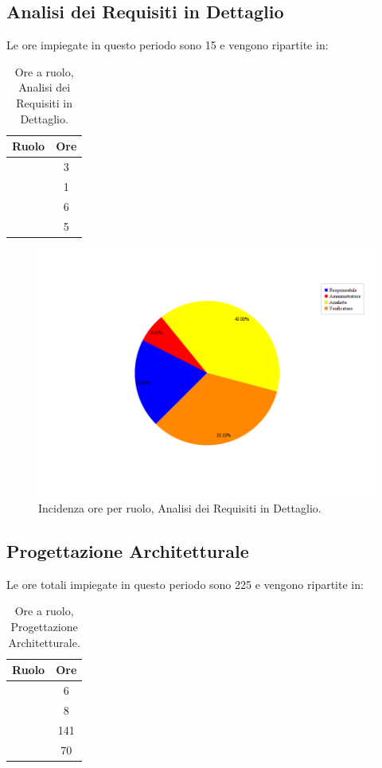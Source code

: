 \subsection{Analisi dei Requisiti in Dettaglio}
Le ore impiegate in questo periodo sono 15 e vengono ripartite in:

\begin{table}[H]
	\begin{center}
		\begin{tabular}{|c|c|}
			\hline
			\textbf{Ruolo}	& \textbf{Ore} \\
			\hline
			\Res	&	3	\\
			\hline
			\Amm	&	1	\\
			\hline
			\Ana	&	6	\\
			\hline
			\Ver	&	5	\\
			\hline
		\end{tabular}
	\end{center}
	\caption{Ore a ruolo, Analisi dei Requisiti in Dettaglio.}
\end{table}

\begin{figure}[H]
	\centering
	\includegraphics[scale=0.5]{immagini/Grafi/OreRuoloRRD}
	\caption{Incidenza ore per ruolo, Analisi dei Requisiti in Dettaglio.}
\end{figure}

\subsection{Progettazione Architetturale}
Le ore totali impiegate in questo periodo sono 225 e vengono ripartite in:
\begin{table}[H]
	\begin{center}
		\begin{tabular}{|c|c|}
			\hline
			\textbf{Ruolo}	& \textbf{Ore} \\
			\hline
			\Res	&	6	\\
			\hline
			\Amm	&	8	\\
			\hline
			\Prog		&	141	\\
			\hline
			\Ver	&	70	\\
			\hline
		\end{tabular}
	\end{center}
	\caption{Ore a ruolo, Progettazione Architetturale.}
\end{table}

